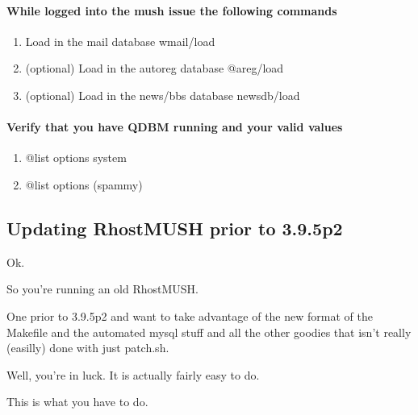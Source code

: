 \documentclass[letterpaper,10pt,english]{sphinxmanual}
\begin{document}
\paragraph{While logged into the mush issue the following commands}
\label{\detokenize{upgrade:while-logged-into-the-mush-issue-the-following-commands}}\begin{enumerate}
%
\item {} 
\sphinxAtStartPar
Load in the mail database
wmail/load

\item {} 
\sphinxAtStartPar
(optional) Load in the autoreg database
@areg/load

\item {} 
\sphinxAtStartPar
(optional) Load in the news/bbs database
newsdb/load

\end{enumerate}


\paragraph{Verify that you have QDBM running and your valid values}
\label{\detokenize{upgrade:verify-that-you-have-qdbm-running-and-your-valid-values}}\begin{enumerate}
%
\item {} 
\sphinxAtStartPar
@list options system

\item {} 
\sphinxAtStartPar
@list options (spammy)

\end{enumerate}


\subsection{Updating RhostMUSH prior to 3.9.5p2}
\label{\detokenize{upgrade:updating-rhostmush-prior-to-3-9-5p2}}
\sphinxAtStartPar
Ok.

\sphinxAtStartPar
So you’re running an old RhostMUSH.

\sphinxAtStartPar
One prior to 3.9.5p2 and want to take advantage of the new
format of the Makefile and the automated mysql stuff and
all the other goodies that isn’t really (easilly) done
with just patch.sh.

\sphinxAtStartPar
Well, you’re in luck.  It is actually fairly easy to do.

\sphinxAtStartPar
This is what you have to do.
\end{document}
